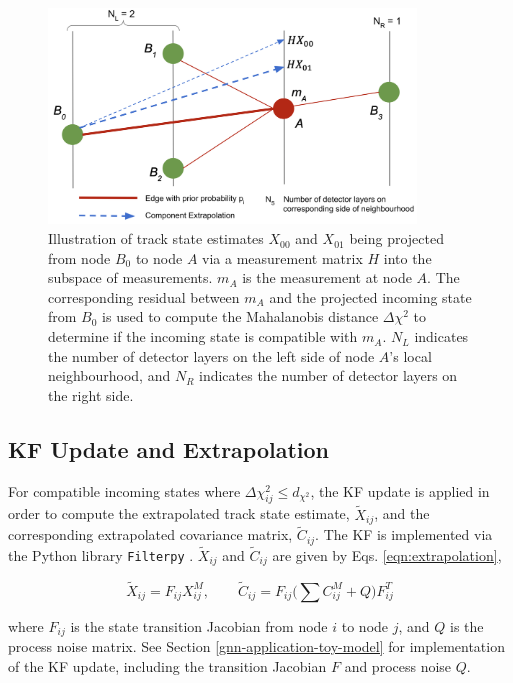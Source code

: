 \begin{figure}[htbp]
        \centering
        \includegraphics[width=0.87\textwidth]{images/5-gnn-algorithm/gnn-extrapolation.png}
        \caption{Illustration of track state estimates $X_{00}$ and $X_{01}$ being projected from node $B_0$ to node $A$ via a measurement matrix $H$ into the subspace of measurements. $m_A$ is the measurement at node $A$. The corresponding residual between $m_A$ and the projected incoming state from $B_0$ is used to compute the Mahalanobis distance $\Delta \chi^{2}$ to determine if the incoming state is compatible with $m_A$. $N_L$ indicates the number of detector layers on the left side of node $A$'s local neighbourhood, and $N_R$ indicates the number of detector layers on the right side.}
        \label{fig:extrapolation}%
\end{figure}


\subsection{KF Update and Extrapolation}
\label{chapter-5-kf-extrapolation}

For compatible incoming states where $\Delta \chi^{2}_{ij} \leq d_{\chi^{2}}$, the KF update is applied in order to compute the extrapolated track state estimate, $\tilde{X}_{ij}$, and the corresponding extrapolated covariance matrix, $\widetilde{C}_{ij}$. The KF is implemented via the Python library \texttt{Filterpy} \cite{filterpy}. $\tilde{X}_{ij}$ and $\widetilde{C}_{ij}$ are given by Eqs. \eqref{eqn:extrapolation},

\begin{equation}
\tilde{X}_{ij} = F_{ij} X_{ij}^{M}, \qquad \tilde{C}_{ij} = F_{ij} \biggl( \sum C_{ij}^{M} + Q \biggl) F^{T}_{ij}
\label{eqn:extrapolation}
\end{equation}

where $F_{ij}$ is the state transition Jacobian from node $i$ to node $j$, and $Q$ is the process noise matrix. See Section \ref{gnn-application-toy-model} for implementation of the KF update, including the transition Jacobian $F$ and process noise $Q$. 







